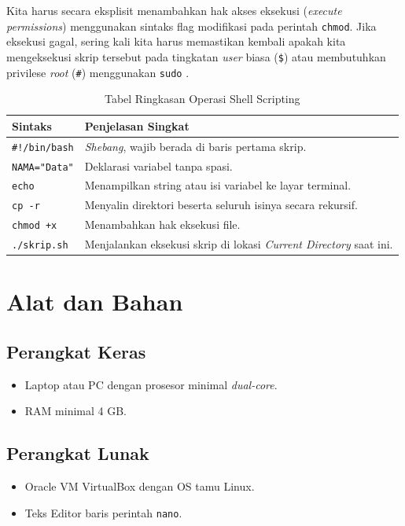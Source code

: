 Kita harus secara eksplisit menambahkan hak akses eksekusi (\textit{execute permissions}) menggunakan sintaks flag modifikasi pada perintah \texttt{chmod}. Jika eksekusi gagal, sering kali kita harus memastikan kembali apakah kita mengeksekusi skrip tersebut pada tingkatan \textit{user} biasa (\texttt{\$}) atau membutuhkan privilese \textit{root} (\texttt{\#}) menggunakan \texttt{sudo} \cite{shotts2019linux}.

\begin{table}[H]
	\caption{Tabel Ringkasan Operasi Shell Scripting}
	\label{tab:m04-dasar-teori}
	\centering
	\begin{tabular}{|l|p{9cm}|}
		\hline
		\textbf{Sintaks} & \textbf{Penjelasan Singkat} \\ \hline
		\texttt{\#!/bin/bash} & \textit{Shebang}, wajib berada di baris pertama skrip. \\ \hline
		\texttt{NAMA="Data"} & Deklarasi variabel tanpa spasi. \\ \hline
		\texttt{echo} & Menampilkan string atau isi variabel ke layar terminal. \\ \hline
		\texttt{cp -r} & Menyalin direktori beserta seluruh isinya secara rekursif. \\ \hline
		\texttt{chmod +x} & Menambahkan hak eksekusi file. \\ \hline
		\texttt{./skrip.sh} & Menjalankan eksekusi skrip di lokasi \textit{Current Directory} saat ini. \\ \hline
	\end{tabular}
\end{table}

\newpage
\section{Alat dan Bahan}
\label{sec:m04-alat-bahan}

\subsection{Perangkat Keras}
\begin{itemize}
	\item Laptop atau PC dengan prosesor minimal \textit{dual-core}.
	\item RAM minimal 4 GB.
\end{itemize}

\subsection{Perangkat Lunak}
\begin{itemize}
	\item Oracle VM VirtualBox dengan OS tamu Linux.
	\item Teks Editor baris perintah \texttt{nano}.
\end{itemize}

